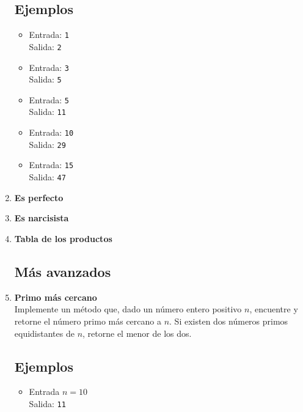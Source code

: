 \begin{enumerate}
    \subsection*{Ejemplos}
    \begin{itemize} 
        \item Entrada: \texttt{1}\\ 
        Salida: \texttt{2}
        \item Entrada: \texttt{3}\\
        Salida: \texttt{5}
    
        \item Entrada: \texttt{5}\\
              Salida: \texttt{11}
        
        \item Entrada: \texttt{10}\\
              Salida: \texttt{29}
        
        \item Entrada: \texttt{15}\\
              Salida: \texttt{47}
    \end{itemize}
    
    \item \textbf{Es perfecto}\\
    

    \item \textbf{Es narcisista}\\
    

    \item \textbf{Tabla de los productos}
    

\subsection*{Más avanzados}
    \item \textbf{Primo más cercano}\\
    Implemente un método que, dado un número entero positivo \( n \), encuentre y retorne el número primo más cercano a \( n \). Si existen dos números primos equidistantes de \( n \), retorne el menor de los dos. 
    \subsection*{Ejemplos}
    \begin{itemize}
        \item Entrada \( n = 10 \)\\
        Salida: \texttt{11}
    

\end{itemize}
\end{enumerate}
